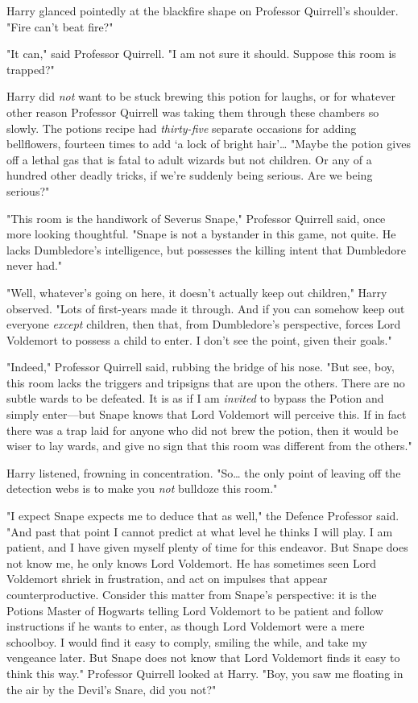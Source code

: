 Harry glanced pointedly at the blackfire shape on Professor Quirrell's
shoulder. "Fire can't beat fire?"

"It can," said Professor Quirrell. "I am not sure it should. Suppose this room
is trapped?"

Harry did \emph{not} want to be stuck brewing this potion for laughs, or for
whatever other reason Professor Quirrell was taking them through these chambers
so slowly. The potions recipe had \emph{thirty-five} separate occasions for
adding bellflowers, fourteen times to add `a lock of bright hair'{\ldots}
"Maybe the potion gives off a lethal gas that is fatal to adult wizards but not
children. Or any of a hundred other deadly tricks, if we're suddenly being
serious. Are we being serious?"

"This room is the handiwork of Severus Snape," Professor Quirrell said, once
more looking thoughtful. "Snape is not a bystander in this game, not quite. He
lacks Dumbledore's intelligence, but possesses the killing intent that
Dumbledore never had."

"Well, whatever's going on here, it doesn't actually keep out children," Harry
observed. "Lots of first-years made it through. And if you can somehow keep out
everyone \emph{except} children, then that, from Dumbledore's perspective,
forces Lord Voldemort to possess a child to enter. I don't see the point, given
their goals."

"Indeed," Professor Quirrell said, rubbing the bridge of his nose. "But see,
boy, this room lacks the triggers and tripsigns that are upon the others. There
are no subtle wards to be defeated. It is as if I am \emph{invited} to bypass
the Potion and simply enter---but Snape knows that Lord Voldemort will perceive
this. If in fact there was a trap laid for anyone who did not brew the potion,
then it would be wiser to lay wards, and give no sign that this room was
different from the others."

Harry listened, frowning in concentration. "So{\ldots} the only point of
leaving off the detection webs is to make you \emph{not} bulldoze this room."

"I expect Snape expects me to deduce that as well," the Defence Professor said.
"And past that point I cannot predict at what level he thinks I will play. I am
patient, and I have given myself plenty of time for this endeavor. But Snape
does not know me, he only knows Lord Voldemort. He has sometimes seen Lord
Voldemort shriek in frustration, and act on impulses that appear
counterproductive. Consider this matter from Snape's perspective: it is the
Potions Master of Hogwarts telling Lord Voldemort to be patient and follow
instructions if he wants to enter, as though Lord Voldemort were a mere
schoolboy. I would find it easy to comply, smiling the while, and take my
vengeance later. But Snape does not know that Lord Voldemort finds it easy to
think this way." Professor Quirrell looked at Harry. "Boy, you saw me floating
in the air by the Devil's Snare, did you not?"

